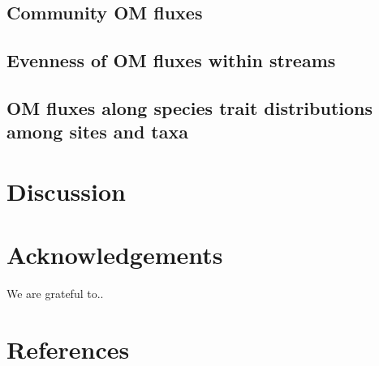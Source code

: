 \documentclass[
]{article}
\begin{document}
\hypertarget{community-om-fluxes}{%
\subsection{Community OM fluxes}\label{community-om-fluxes}}

\hypertarget{evenness-of-om-fluxes-within-streams}{%
\subsection{Evenness of OM fluxes within
streams}\label{evenness-of-om-fluxes-within-streams}}

\hypertarget{om-fluxes-along-species-trait-distributions-among-sites-and-taxa}{%
\subsection{OM fluxes along species trait distributions among sites and
taxa}\label{om-fluxes-along-species-trait-distributions-among-sites-and-taxa}}

\hypertarget{discussion}{%
\section{Discussion}\label{discussion}}

\hypertarget{acknowledgements}{%
\section{Acknowledgements}\label{acknowledgements}}

We are grateful to..

\hypertarget{references}{%
\section{References}\label{references}}
\end{document}

